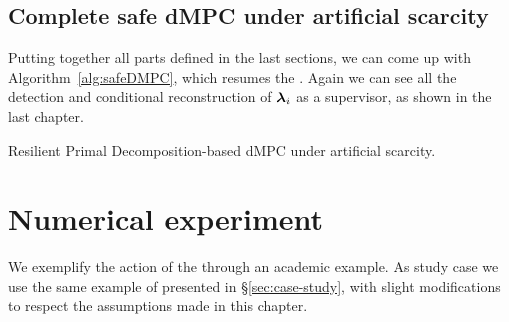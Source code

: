 \documentclass[../main.tex]{subfiles}
\begin{document}
\subsection{Complete safe dMPC under artificial scarcity}\label{sec:complete-safe-dmpc-ineq}
Putting together all parts defined in the last sections, we can come up with Algorithm~\ref{alg:safeDMPC}, which resumes the \rpdmpcas{}.
Again we can see all the detection and conditional reconstruction of $\boldsymbol{\lambda}_{i}$ as a supervisor, as shown in the last chapter.

\begin{algorithm2e}[h]
  \DontPrintSemicolon
 \caption{Resilient Primal Decomposition-based dMPC under artificial scarcity.}\label{alg:safeDMPC}
\end{algorithm2e}

\section{Numerical experiment}\label{sec:numerical-experiment-ineq}

We exemplify the action of the \rpdmpcas{} through an academic example.
As study case we use the same example of \dhn{} presented in \S\ref{sec:case-study}, with slight modifications to respect the assumptions made in this chapter.
\end{document}
